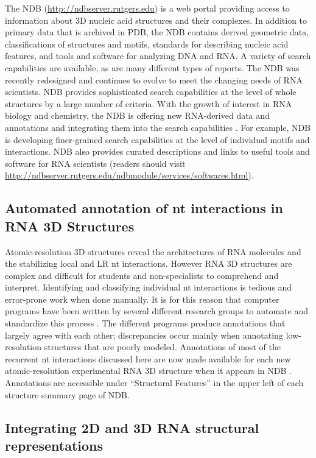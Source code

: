 The NDB (\url{http://ndbserver.rutgers.edu}) is a web portal providing access to
information about 3D nucleic acid structures and their complexes. In addition to
primary data that is archived in PDB, the NDB contains derived geometric data,
classifications of structures and motifs, standards for describing nucleic acid
features, and tools and software for analyzing DNA and RNA. A variety of search
capabilities are available, as are many different types of reports. The NDB was
recently redesigned and continues to evolve to meet the changing needs of RNA
scientists. NDB provides sophisticated search capabilities at the level of whole
structures by a large number of criteria. With the growth of interest in RNA
biology and chemistry, the NDB is offering new RNA-derived data and annotations
and integrating them into the search capabilities
\cite{CoimbatoreNarayanan2014}. For example, NDB is developing finer-grained
search capabilities at the level of individual motifs and interactions. NDB also
provides curated descriptions and links to useful tools and software for RNA
scientists (readers should visit
\url{http://ndbserver.rutgers.edu/ndbmodule/services/softwares.html}).

\subsection{Automated annotation of nt interactions in RNA 3D Structures}

Atomic-resolution 3D structures reveal the architectures of RNA molecules and
the stabilizing local and LR nt interactions. However RNA 3D structures are
complex and difficult for students and non-specialists to comprehend and
interpret. Identifying and classifying individual nt interactions is tedious and
error-prone work when done manually. It is for this reason that computer
programs have been written by several different research groups to automate and
standardize this process \cite{Petrov2011a, Sarver2008a, Yang2003a,
Gendron2001b, Parisien2008a}. The different programs produce annotations that
largely agree with each other; discrepancies occur mainly when annotating
low-resolution structures that are poorly modeled. Annotations of most of the
recurrent nt interactions discussed here are now made available for each new
atomic-resolution experimental RNA 3D structure when it appears in NDB
\cite{Petrov2013}. Annotations are accessible under ``Structural Features'' in
the upper left of each structure summary page of NDB. 

\subsection{Integrating 2D and 3D RNA structural representations}

